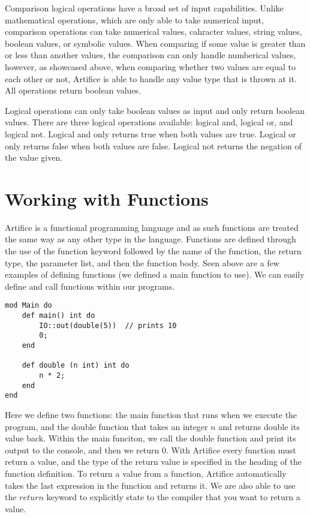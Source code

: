 \documentclass{article}
\begin{document}
Comparison logical operations have a broad set of input capabilities. Unlike mathematical operations, which are only able to take numerical input,
comparison operations can take numerical values, cahracter values, string values, boolean values, or symbolic values. When comparing if some value is
greater than or less than another values, the comparison can only handle numberical values, however, as showcased above, when comparing whether two
values are equal to each other or not, Artifice is able to handle any value type that is thrown at it. All operations return boolean values.

Logical operations can only take boolean values as input and only return boolean values. There are three logical operations available: logical and,
logical or, and logical not. Logical and only returns true when both values are true. Logical or only returns false when both values are false.
Logical not returns the negation of the value given.


\section{Working with Functions}

Artifice is a functional programming language and as such functions are treated the same way as any other type in the language. Functions are defined through
the use of the function keyword followed by the name of the function, the return type, the parameter list, and then the function body. Seen above are a few
examples of defining functions (we defined a main function to use). We can easily define and call functions within our programs.

\begin{lstlisting}
mod Main do
	def main() int do
		IO::out(double(5))  // prints 10
		0;
	end

	def double (n int) int do
		n * 2;
	end
end
\end{lstlisting}

Here we define two functions: the main function that runs when we execute the program, and the double function that takes an integer $n$ and returns
double its value back. Within the main funciton, we call the double function and print its output to the console, and then we return $0$. With Artifice
every function must return a value, and the type of the return value is specified in the heading of the function definition. To return a value from
a function, Artifice automatically takes the last expression in the function and returns it. We are also able to use the $return$ keyword to explicitly
state to the compiler that you want to return a value.
\end{document}
